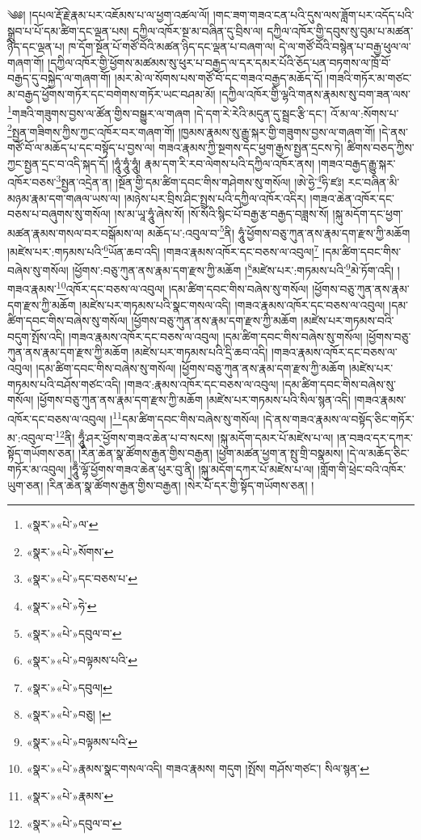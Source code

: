 ༄༅། །དཔལ་རྡོ་རྗེ་རྣམ་པར་འཇོམས་པ་ལ་ཕྱག་འཚལ་ལོ། །གང་ཟག་གཟའ་ངན་པའི་དུས་ལས་ཟློག་པར་འདོད་པའི་སྒྲུབ་པ་པོ་དམ་ཚིག་དང་ལྡན་པས། དཀྱིལ་འཁོར་སྔ་མ་བཞིན་དུ་བྲིས་ལ། དཀྱིལ་འཁོར་གྱི་དབུས་སུ་བུམ་པ་མཚན་ཉིད་དང་ལྡན་པ། ཁ་དོག་སྔོན་པོ་གཙོ་བོའི་མཚན་ཉིད་དང་ལྡན་པ་བཞག་ལ། དེ་ལ་གཙོ་བོའི་བསྙེན་པ་བརྒྱ་ཕུལ་ལ་གཞག་གོ། །དཀྱིལ་འཁོར་གྱི་ཕྱོགས་མཚམས་སུ་ཕུར་པ་བརྒྱད་ལ་དར་དམར་པོའི་ཅོད་པན་བཏགས་ལ་ཁྲོ་བོ་བརྒྱད་དུ་བསྐྱེད་ལ་གཞག་གོ། །མར་མེ་ལ་སོགས་པས་གཙོ་བོ་དང་གཟའ་བརྒྱད་མཆོད་དོ། །གཟའི་གཏོར་མ་གཙང་མ་བརྒྱད་ཕྱོགས་གཏོར་དང་བགེགས་གཏོར་ཡང་བཤམ་མོ། །དཀྱིལ་འཁོར་གྱི་ལྷའི་གནས་རྣམས་སུ་བག་ཟན་ལས་\footnote{«སྣར་»«པེ་»ལ་}གཟའི་གཟུགས་བྱས་ལ་ཚོན་གྱིས་བསྒྱུར་ལ་གཞག །དེ་དག་རེ་རེའི་མདུན་དུ་སྦྲང་རྩི་དང་། འོ་མ་ལ་:སོགས་པ་\footnote{«སྣར་»«པེ་»སོགས་}སྤྱན་གཟིགས་ཀྱིས་ཀྱང་འཁོར་བར་གཞག་གོ། །ཁྱམས་རྣམས་སུ་རྒྱུ་སྐར་གྱི་གཟུགས་བྱས་ལ་གཞག་གོ། །དེ་ནས་གཙོ་བོ་ལ་མཆོད་པ་དང་བསྟོད་པ་བྱས་ལ། གཟའ་རྣམས་ཀྱི་སྔགས་དང་ཕྱག་རྒྱས་སྤྱན་དྲངས་ཏེ། ཚིགས་བཅད་ཀྱིས་ཀྱང་སྤྱན་དྲང་བ་འདི་སྐད་དོ། །ཧཱུཾ་ཧཱུཾ་ཧཱུཾ། རྣམ་དག་རི་རབ་ལེགས་པའི་དཀྱིལ་འཁོར་ནས། །གཟའ་བརྒྱད་རྒྱུ་སྐར་འཁོར་བཅས་\footnote{«སྣར་»«པེ་»དང་བཅས་པ་}སྤྱན་འདྲེན་ན། །སྔོན་གྱི་དམ་ཚིག་དབང་གིས་གཤེགས་སུ་གསོལ། །ཨེ་ཧྱེ་\footnote{«སྣར་»«པེ་»ཧེ་}ཧི་ཛཿ། རང་བཞིན་མི་མཉམ་རྣམ་དག་གཞལ་ཡས་ལ། །མཉེས་པར་བྲིས་ཤིང་སྤྲས་པའི་དཀྱིལ་འཁོར་འདིར། །གཟའ་ཆེན་འཁོར་དང་བཅས་པ་བཞུགས་སུ་གསོལ། །ས་མ་ཡཱ་ཧཱུཾ་ཞེས་སོ། །སོ་སོའི་སྙིང་པོ་བརྒྱ་རྩ་བརྒྱད་བཟླས་སོ། །སྐུ་མདོག་དང་ཕྱག་མཚན་རྣམས་གསལ་བར་བསྒོམས་ལ། མཆོད་པ་:འབུལ་བ་\footnote{«སྣར་»«པེ་»དབུལ་བ་}ནི། ཧཱུཾ་ཕྱོགས་བཅུ་ཀུན་ནས་རྣམ་དག་རྫས་ཀྱི་མཆོག །མཛེས་པར་:གཏམས་པའི་\footnote{«སྣར་»«པེ་»བལྟམས་པའི་}ཡོན་ཆབ་འདི། །གཟའ་རྣམས་འཁོར་དང་བཅས་ལ་འབུལ།\footnote{«སྣར་»«པེ་»དབུལ།} །དམ་ཚིག་དབང་གིས་བཞེས་སུ་གསོལ། །ཕྱོགས་:བཅུ་ཀུན་ནས་རྣམ་དག་རྫས་ཀྱི་མཆོག །\footnote{«སྣར་»«པེ་»བཅུ། །}མཛེས་པར་:གཏམས་པའི་\footnote{«སྣར་»«པེ་»བལྟམས་པའི་}མེ་ཏོག་འདི། །གཟའ་རྣམས་\footnote{«སྣར་»«པེ་»རྣམས་སྣང་གསལ་འདི། གཟའ་རྣམས། གདུག །སྤོས། གཤོས་གཙང་། སིལ་སྙན་}འཁོར་དང་བཅས་ལ་འབུལ། །དམ་ཚིག་དབང་གིས་བཞེས་སུ་གསོལ། །ཕྱོགས་བཅུ་ཀུན་ནས་རྣམ་དག་རྫས་ཀྱི་མཆོག །མཛེས་པར་གཏམས་པའི་སྣང་གསལ་འདི། །གཟའ་རྣམས་འཁོར་དང་བཅས་ལ་འབུལ། །དམ་ཚིག་དབང་གིས་བཞེས་སུ་གསོལ། །ཕྱོགས་བཅུ་ཀུན་ནས་རྣམ་དག་རྫས་ཀྱི་མཆོག །མཛེས་པར་གཏམས་བའི་བདུག་སྤོས་འདི། །གཟའ་རྣམས་འཁོར་དང་བཅས་ལ་འབུལ། །དམ་ཚིག་དབང་གིས་བཞེས་སུ་གསོལ། །ཕྱོགས་བཅུ་ཀུན་ནས་རྣམ་དག་རྫས་ཀྱི་མཆོག །མཛེས་པར་གཏམས་པའི་དྲི་ཆབ་འདི། །གཟའ་རྣམས་འཁོར་དང་བཅས་ལ་འབུལ། །དམ་ཚིག་དབང་གིས་བཞེས་སུ་གསོལ། །ཕྱོགས་བཅུ་ཀུན་ནས་རྣམ་དག་རྫས་ཀྱི་མཆོག །མཛེས་པར་གཏམས་པའི་བཤོས་གཙང་འདི། །གཟའ་:རྣམས་འཁོར་དང་བཅས་ལ་འབུལ། །དམ་ཚིག་དབང་གིས་བཞེས་སུ་གསོལ། །ཕྱོགས་བཅུ་ཀུན་ནས་རྣམ་དག་རྫས་ཀྱི་མཆོག །མཛེས་པར་གཏམས་པའི་སིལ་སྙན་འདི། །གཟའ་རྣམས་འཁོར་དང་བཅས་ལ་འབུལ། །\footnote{«སྣར་»«པེ་»རྣམས་}དམ་ཚིག་དབང་གིས་བཞེས་སུ་གསོལ། །དེ་ནས་གཟའ་རྣམས་ལ་བསྟོད་ཅིང་གཏོར་མ་:འབུལ་བ་\footnote{«སྣར་»«པེ་»དབུལ་བ་}ནི། ཧཱུྃ་ཤར་ཕྱོགས་གཟའ་ཆེན་པ་བ་སངས། །སྐུ་མདོག་དམར་པོ་མཛེས་པ་ལ། །ན་བཟའ་དར་དཀར་སྟོད་གཡོགས་ཅན། །རིན་ཆེན་སྣ་ཚོགས་རྒྱན་གྱིས་བརྒྱན། །ཕྱག་མཚན་ཕྱག་ན་སྤུ་གྲི་བསྣམས། །དེ་ལ་མཆོད་ཅིང་གཏོར་མ་འབུལ། །ཧཱུྃ་ལྷོ་ཕྱོགས་གཟའ་ཆེན་ཕུར་བུ་ནི། །སྐུ་མདོག་དཀར་པོ་མཛེས་པ་ལ། །གློག་གི་ཕྲེང་བའི་འཁོར་ཡུག་ཅན། །རིན་ཆེན་སྣ་ཚོགས་རྒྱན་གྱིས་བརྒྱན། །སེར་པོ་དར་གྱི་སྟོད་གཡོགས་ཅན། །
